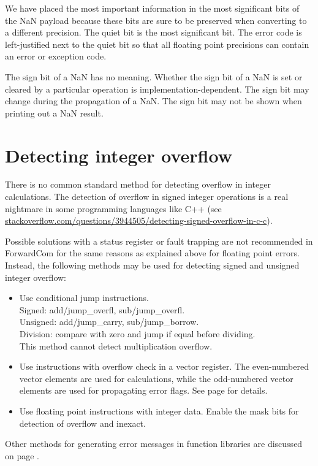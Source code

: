 \documentclass[forwardcom.tex]{subfiles}
\begin{document}
We have placed the most important information in the most significant bits of the NaN payload because these bits are sure to be preserved when converting to a different precision. The quiet bit is the most significant bit. The error code is left-justified next to the quiet bit so that all floating point precisions can contain an error or exception code.
\vv

The sign bit of a NaN has no meaning. Whether the sign bit of a NaN is set or cleared by a particular operation is implementation-dependent. The sign bit may change during the propagation of a NaN. The sign bit may not be shown when printing out a NaN result.
\vv


\section{Detecting integer overflow} 
\label{integerOverflowDetection}
There is no common standard method for detecting overflow in integer calculations. The detection of overflow in signed integer operations is a real nightmare in some programming languages like C++ (see 
\href{https://stackoverflow.com/questions/3944505/detecting-signed-overflow-in-c-c}{stackoverflow.com/questions/3944505/detecting-signed-overflow-in-c-c}).
\vv

Possible solutions with a status register or fault trapping are not recommended in ForwardCom for the same reasons as explained above for floating point errors. 
Instead, the following methods may be used for detecting signed and unsigned integer overflow: 

\begin{itemize}
  \item Use conditional jump instructions. \\
    Signed: add/jump\_overfl, sub/jump\_overfl. \\
    Unsigned: add/jump\_carry, sub/jump\_borrow. \\
    Division: compare with zero and jump if equal before dividing. \\
    This method cannot detect multiplication overflow.  
  
  \item Use instructions with overflow check in a vector register. 
    The even-numbered vector elements are used for calculations, while
    the odd-numbered vector elements are used for propagating error flags. 
    See page \pageref{table:addOcInstruction} for details. 
    
  \item Use floating point instructions with integer data. 
    Enable the mask bits for detection of overflow and inexact.
  
\end{itemize}
\vv

Other methods for generating error messages in function libraries are discussed on page \pageref{errorMessageHandling}.
\vv
\end{document}
